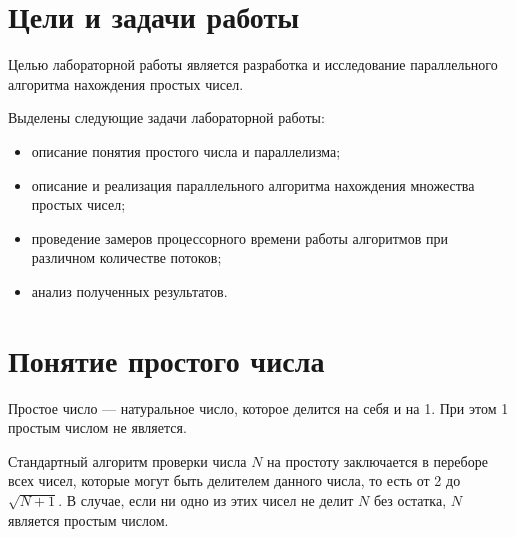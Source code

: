 \section{Цели и задачи работы}
Целью лабораторной работы является разработка и исследование параллельного алгоритма нахождения простых чисел.

Выделены следующие задачи лабораторной работы:

\begin{itemize}
\item описание понятия простого числа и параллелизма;
\item описание и реализация параллельного алгоритма нахождения множества простых чисел;
\item проведение замеров процессорного времени работы алгоритмов при различном количестве потоков;
\item анализ полученных результатов.
\end{itemize}

\section{Понятие простого числа}
Простое число --- натуральное число, которое делится на себя и на 1. При этом 1 простым числом не является\cite{prime_def}.

Стандартный алгоритм проверки числа $ N $ на простоту заключается в переборе всех чисел, которые могут быть делителем данного числа, то есть от 2 до $ \sqrt{N+1} $. В случае, если ни одно из этих чисел не делит $N$ без остатка, $N$ является простым числом.